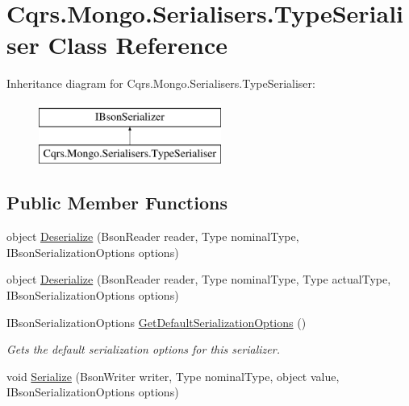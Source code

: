 \hypertarget{classCqrs_1_1Mongo_1_1Serialisers_1_1TypeSerialiser}{}\section{Cqrs.\+Mongo.\+Serialisers.\+Type\+Serialiser Class Reference}
\label{classCqrs_1_1Mongo_1_1Serialisers_1_1TypeSerialiser}
Inheritance diagram for Cqrs.\+Mongo.\+Serialisers.\+Type\+Serialiser\+:\begin{figure}[H]
\begin{center}
\leavevmode
\includegraphics[height=2.000000cm]{classCqrs_1_1Mongo_1_1Serialisers_1_1TypeSerialiser}
\end{center}
\end{figure}
\subsection*{Public Member Functions}
\begin{DoxyCompactItemize}
\item 
object \hyperlink{classCqrs_1_1Mongo_1_1Serialisers_1_1TypeSerialiser_a38d61038bc9aab09572c9c05e8b9460b_a38d61038bc9aab09572c9c05e8b9460b}{Deserialize} (Bson\+Reader reader, Type nominal\+Type, I\+Bson\+Serialization\+Options options)
\item 
object \hyperlink{classCqrs_1_1Mongo_1_1Serialisers_1_1TypeSerialiser_aca73371a2a3ddd291d023584cb676ed3_aca73371a2a3ddd291d023584cb676ed3}{Deserialize} (Bson\+Reader reader, Type nominal\+Type, Type actual\+Type, I\+Bson\+Serialization\+Options options)
\item 
I\+Bson\+Serialization\+Options \hyperlink{classCqrs_1_1Mongo_1_1Serialisers_1_1TypeSerialiser_af0e31e1a524812836d0b73dca29b1332_af0e31e1a524812836d0b73dca29b1332}{Get\+Default\+Serialization\+Options} ()
\begin{DoxyCompactList}\small\item\em Gets the default serialization options for this serializer. \end{DoxyCompactList}\item 
void \hyperlink{classCqrs_1_1Mongo_1_1Serialisers_1_1TypeSerialiser_aed86906daa5c18a29fd06fb3d9d3fd13_aed86906daa5c18a29fd06fb3d9d3fd13}{Serialize} (Bson\+Writer writer, Type nominal\+Type, object value, I\+Bson\+Serialization\+Options options)
\end{DoxyCompactItemize}


